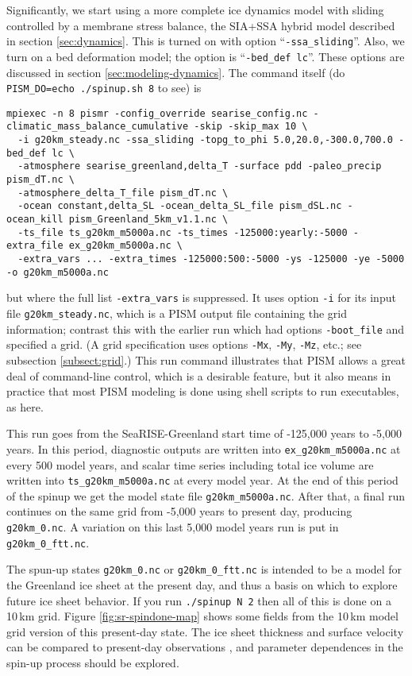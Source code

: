 Significantly, we start using a more complete ice dynamics model with sliding controlled by a membrane stress balance, the SIA+SSA hybrid model described in section \ref{sec:dynamics}.  This is turned on with option ``\texttt{-ssa_sliding}''.  Also, we turn on a bed deformation model; the option is ``\texttt{-bed_def lc}''.  These options are discussed in section \ref{sec:modeling-dynamics}.  The command itself (do \verb|PISM_DO=echo ./spinup.sh 8| to see) is
\small
\begin{verbatim}
mpiexec -n 8 pismr -config_override searise_config.nc -climatic_mass_balance_cumulative -skip -skip_max 10 \
  -i g20km_steady.nc -ssa_sliding -topg_to_phi 5.0,20.0,-300.0,700.0 -bed_def lc \
  -atmosphere searise_greenland,delta_T -surface pdd -paleo_precip pism_dT.nc \
  -atmosphere_delta_T_file pism_dT.nc \
  -ocean constant,delta_SL -ocean_delta_SL_file pism_dSL.nc -ocean_kill pism_Greenland_5km_v1.1.nc \
  -ts_file ts_g20km_m5000a.nc -ts_times -125000:yearly:-5000 -extra_file ex_g20km_m5000a.nc \
  -extra_vars ... -extra_times -125000:500:-5000 -ys -125000 -ye -5000 -o g20km_m5000a.nc
\end{verbatim}
\normalsize
but where the full list \verb|-extra_vars| is suppressed.  It uses option \verb|-i| for its input file \verb|g20km_steady.nc|, which is a PISM output file containing the grid information; contrast this with the earlier run which had options \verb|-boot_file| and specified a grid.   (A grid specification uses options \verb|-Mx|, \verb|-My|, \verb|-Mz|, etc.; see subsection \ref{subsect:grid}.)  This run command illustrates that PISM allows a great deal of command-line control, which is a desirable feature, but it also means in practice that most PISM modeling is done using shell scripts to run executables, as here.

This run goes from the SeaRISE-Greenland start time of -125,000 years to -5,000 years.  In this period, diagnostic outputs are written into \texttt{ex_g20km_m5000a.nc} at every 500 model years, and scalar time series including total ice volume are written into \texttt{ts_g20km_m5000a.nc} at every model year.  At the end of this period of the spinup we get the model state file \texttt{g20km_m5000a.nc}.  After that, a final run continues on the same grid from -5,000 years to present day, producing \texttt{g20km_0.nc}.  A variation on this last 5,000 model years run is put in \texttt{g20km_0_ftt.nc}.



The spun-up states \texttt{g20km_0.nc} or \texttt{g20km_0_ftt.nc} is intended to be a model for the Greenland ice sheet at the present day, and thus a basis on which to explore future ice sheet behavior.  If you run \texttt{./spinup N 2} then all of this is done on a 10\,km grid.  Figure \ref{fig:sr-spindone-map} shows some fields from the 10\,km model grid version of this present-day state.  The ice sheet thickness and surface velocity can be compared to present-day observations \cite{BKAJS}, and parameter dependences in the spin-up process should be explored.


